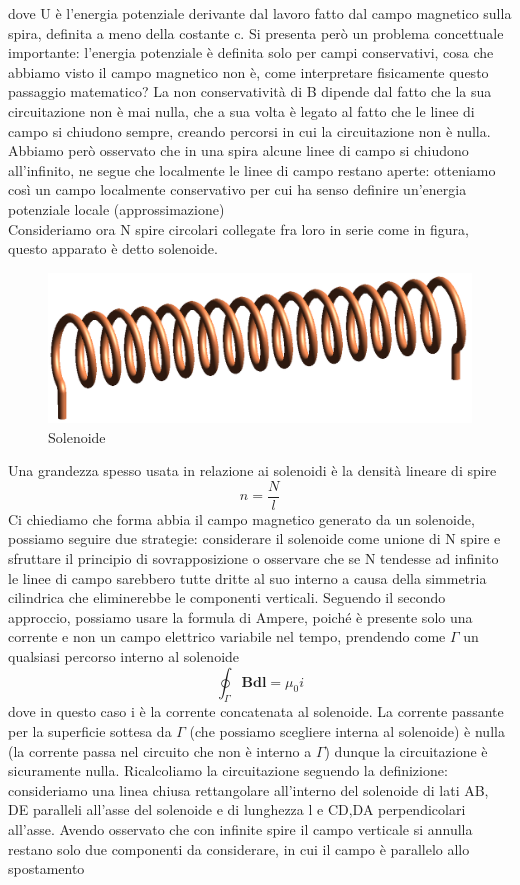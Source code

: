 \documentclass[
10pt, %
a4paper, %
oneside, %
headinclude,footinclude, %
BCOR5mm, %
]{scrartcl}
\begin{document}
dove U è l'energia potenziale derivante dal lavoro fatto dal campo magnetico sulla spira, definita a meno della costante c. Si presenta però un problema concettuale importante: l'energia potenziale è definita solo per campi conservativi, cosa che abbiamo visto il campo magnetico non è, come interpretare fisicamente questo passaggio matematico? La non conservatività di B dipende dal fatto che la sua circuitazione non è mai nulla, che a sua volta è legato al fatto che le linee di campo si chiudono sempre, creando percorsi in cui la circuitazione non è nulla. Abbiamo però osservato che in una spira alcune linee di campo si chiudono all'infinito, ne segue che localmente le linee di campo restano aperte: otteniamo così un campo localmente conservativo per cui ha senso definire un'energia potenziale locale (approssimazione)\\ 
Consideriamo ora N spire circolari collegate fra loro in serie come in figura, questo apparato è detto solenoide.
\begin{figure}[h!]
	\centering
	\includegraphics[width=0.6\linewidth]{../images/Solenoid}
	\caption{Solenoide}
	\label{fig:solenoide}
\end{figure}
\FloatBarrier
Una grandezza spesso usata in relazione ai solenoidi è la densità lineare di spire 
\[n = \frac{N}{l}\]
Ci chiediamo che forma abbia il campo magnetico generato da un solenoide, possiamo seguire due strategie: considerare il solenoide come unione di N spire e sfruttare il principio di sovrapposizione o osservare che se N tendesse ad infinito le linee di campo sarebbero tutte dritte al suo interno a causa della simmetria cilindrica che eliminerebbe le componenti verticali. Seguendo il secondo approccio, possiamo usare la formula di Ampere, poiché è presente solo una corrente e non un campo elettrico variabile nel tempo, prendendo come $\Gamma$ un qualsiasi percorso interno al solenoide
\[\oint_{\Gamma}\mathbf{B}\mathbf{dl}= \mu_0 i\]
dove in questo caso i è la corrente concatenata al solenoide. La corrente passante per la superficie sottesa da $\Gamma$ (che possiamo scegliere interna al solenoide) è nulla (la corrente passa nel circuito che non è interno a $\Gamma$) dunque la circuitazione è sicuramente nulla. 
Ricalcoliamo la circuitazione seguendo la definizione: consideriamo una linea chiusa rettangolare all'interno del solenoide di lati AB, DE paralleli all'asse del solenoide e di lunghezza l e CD,DA perpendicolari all'asse. Avendo osservato che con infinite spire il campo verticale si annulla restano solo due componenti da considerare, in cui il campo è parallelo allo spostamento
\end{document}
